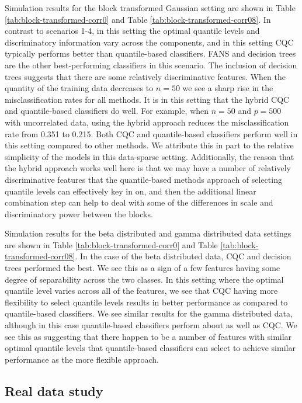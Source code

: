 Simulation results for the block transformed Gaussian setting are shown in Table
\ref{tab:block-transformed-corr0} and Table \ref{tab:block-transformed-corr08}.
In contrast to scenarios 1-4, in this setting the optimal quantile levels and
discriminatory information vary across the components, and in this setting CQC
typically performs better than quantile-based classifiers.  FANS and decision
trees are the other best-performing classifiers in this scenario.  The inclusion
of decision trees suggests that there are some relatively discriminative
features.  When the quantity of the training data decreases to $n = 50$ we see a
sharp rise in the misclassification rates for all methods.  It is in this
setting that the hybrid CQC and quantile-based classifiers do well.  For
example, when $n = 50$ and $p = 500$ with uncorrelated data, using the hybrid
approach reduces the misclassification rate from 0.351 to 0.215.  Both CQC and
quantile-based classifiers perform well in this setting compared to other
methods.  We attribute this in part to the relative simplicity of the models in
this data-sparse setting.  Additionally, the reason that the hybrid approach
works well here is that we may have a number of relatively discriminative
features that the quantile-based methods approach of selecting quantile levels
can effectively key in on, and then the additional linear combination step can
help to deal with some of the differences in scale and discriminatory power
between the blocks.

Simulation results for the beta distributed and gamma distributed data settings
are shown in Table \ref{tab:block-transformed-corr0} and Table
\ref{tab:block-transformed-corr08}.  In the case of the beta distributed data,
CQC and decision trees performed the best.  We see this as a sign of a few
features having some degree of separability across the two classes.  In this
setting where the optimal quantile level varies across all of the features, we
see that CQC having more flexibility to select quantile levels results in better
performance as compared to quantile-based classifiers.  We see similar results
for the gamma distributed data, although in this case quantile-based classifiers
perform about as well as CQC.  We see this as suggesting that there happen to be
a number of features with similar optimal quantile levels that quantile-based
classifiers can select to achieve similar performance as the more flexible
approach.




\subsection{Real data study}
\label{sec:real-data-study}

